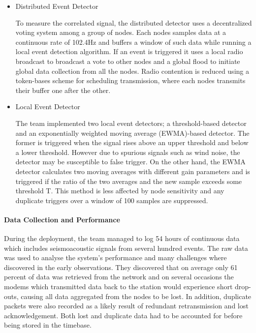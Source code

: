 \begin{itemize}
\item Distributed Event Detector

To measure the correlated signal, the distributed detector uses a decentralized voting system among a group of nodes. Each nodes samples data at a continuous rate of 102.4Hz and buffers a window of such data while running a local event detection algorithm. If an event is triggered it uses a local radio broadcast to broadcast a vote to other nodes and a global flood to initiate global data collection from all the nodes. Radio contention is reduced using a token-bases scheme for scheduling transmission, where each nodes transmits their buffer one after the other. 

\item Local Event Detector

The team implemented two local event detectors; a threshold-based detector and an exponentially weighted moving average (EWMA)-based detector. The former is triggered when the signal rises above an upper threshold and below a lower threshold. However due to spurious signals such as wind noise, the detector may be susceptible to false trigger. On the other hand, the EWMA detector calculates two moving averages with different gain parameters and is triggered if the ratio of the two averages and the new sample exceeds some threshold T. This method is less affected by node sensitivity and any duplicate triggers over a window of 100 samples are suppressed.
\end{itemize}

\paragraph{Data Collection and Performance}

During the deployment, the team managed to log 54 hours of continuous data which includes seismoacoustic signals from several hundred events. The raw data was used to analyse the system's performance and many challenges where discovered in the early observations. They discovered that on average only 61 percent of data was retrieved from the network and on several occasions the modems which transmitted data back to the station would experience short drop-outs, causing all data aggregated from the nodes to be lost. In addition, duplicate packets were also recorded as a likely result of redundant retransmission and lost acknowledgement. Both lost and duplicate data had to be accounted for before being stored in the timebase.

